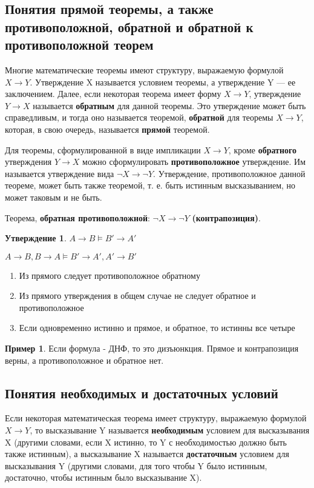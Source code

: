 \documentclass[a4paper]{article}
\theoremstyle{definition}
\newtheorem*{example}{Пример}
\newtheorem*{statement}{Утверждение}
\theoremstyle{remark}
\begin{document}
    \subsection{Понятия прямой теоремы, а также противоположной, обратной и обратной к противоположной теорем}
    Многие математические теоремы имеют структуру, выражаемую формулой $X\to Y$. 
    Утверждение X называется условием теоремы, а утверждение Y — ее заключением.
    Далее, если некоторая теорема имеет форму $X\to Y$, утверждение $Y\to X$ называется \textbf{обратным} для данной теоремы.
    Это утверждение может быть справедливым, и тогда оно называется теоремой, \textbf{обратной} для теоремы $X\to Y$, которая, 
    в свою очередь, называется \textbf{прямой} теоремой.

    Для теоремы, сформулированной в виде импликации $X\to Y$, кроме \textbf{обратного} утверждения $Y\to X$
    можно сформулировать \textbf{противоположное} утверждение. Им называется утверждение вида $\lnot X\to\lnot Y$.
    Утверждение, противоположное данной теореме, может быть также теоремой, т. е. быть истинным высказыванием,
    но может таковым и не быть. 

    Теорема, \textbf{обратная противоположной}: $\lnot X\to\lnot Y$ \textbf{(контрапозиция)}.
    \begin{statement}
        $A\to B \models B' \to A'$

        $A\to B, B\to A \models B' \to A', A' \to B'$

        \begin{enumerate}
            \item Из прямого следует противоположное обратному
            \item Из прямого утверждения в общем случае не следует обратное и противоположное 
            \item Если одновременно истинно и прямое, и обратное, то истинны все четыре
        \end{enumerate}
    \end{statement}
    \begin{example}
        Если формула - ДНФ, то это дизъюнкция.
        Прямое и контрапозиция верны, а противоположное и обратное нет.
    \end{example}
    \subsection{Понятия необходимых и достаточных условий}
    Если некоторая математическая теорема имеет структуру, выражаемую формулой $X\to Y$, то высказывание Y 
    называется \textbf{необходимым} условием для высказывания X (другими словами, если X истинно, то Y с необходимостью должно быть 
    также истинным), а высказывание X называется \textbf{достаточным} условием для высказывания Y (другими словами, для того чтобы Y 
    было истинным, достаточно, чтобы истинным было высказывание X).
\end{document}
